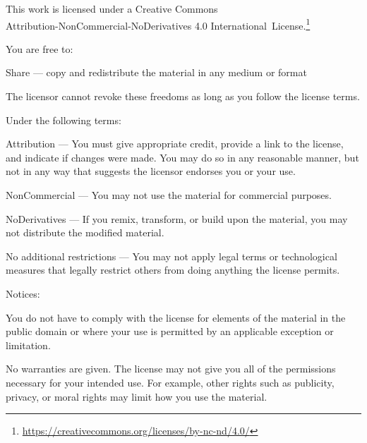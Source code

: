 \cleartorecto
\thispagestyle{plain}

\enlargethispage{\baselineskip}

{\fontsize{10}{13}\selectfont%
\setlength{\parindent}{0pt}%
\raggedright\label{copyright-details}%
\setlength{\parskip}{6pt}%

{\centering

{\Large\ccbyncnd}

This work is licensed under a Creative Commons\\
Attribution-NonCommercial-NoDerivatives 4.0 International~License.\footnote{%
\href{https://creativecommons.org/licenses/by-nc-nd/4.0/}{https://creativecommons.org/licenses/by-nc-nd/4.0/}}

}

You are free to:

\begin{packeditemize}
\item Share — copy and redistribute the material in any medium or format
\end{packeditemize}

The licensor cannot revoke these freedoms as long as you follow the license terms.

Under the following terms:

\begin{packeditemize}
\item Attribution — You must give appropriate credit, provide a link to the license, and indicate if changes were made. You may do so in any reasonable manner, but not in any way that suggests the licensor endorses you or your use.
\item NonCommercial — You may not use the material for commercial purposes.
\item NoDerivatives — If you remix, transform, or build upon the material, you may not distribute the modified material.
\end{packeditemize}

No additional restrictions — You may not apply legal terms or technological measures that legally restrict others from doing anything the license permits.

Notices:

You do not have to comply with the license for elements of the material in the public domain or where your use is permitted by an applicable exception or limitation.

No warranties are given. The license may not give you all of the permissions necessary for your intended use. For example, other rights such as publicity, privacy, or moral rights may limit how you use the material.

}
